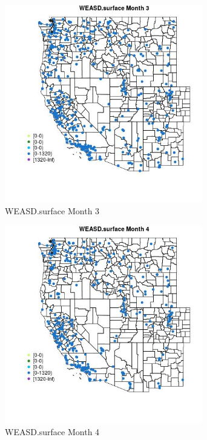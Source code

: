 \begin{figure} 
\centering  
\includegraphics[width=0.77\textwidth]{Code_Outputs/Report_ML_input_PM25_Step4_part_e_de_duplicated_aves_compiled_2019-05-18wNAs_MapObsMo3WEASDsurface.jpg} 
\caption{\label{fig:Report_ML_input_PM25_Step4_part_e_de_duplicated_aves_compiled_2019-05-18wNAsMapObsMo3WEASDsurface}WEASD.surface Month 3} 
\end{figure} 
 

\begin{figure} 
\centering  
\includegraphics[width=0.77\textwidth]{Code_Outputs/Report_ML_input_PM25_Step4_part_e_de_duplicated_aves_compiled_2019-05-18wNAs_MapObsMo4WEASDsurface.jpg} 
\caption{\label{fig:Report_ML_input_PM25_Step4_part_e_de_duplicated_aves_compiled_2019-05-18wNAsMapObsMo4WEASDsurface}WEASD.surface Month 4} 
\end{figure} 
 


